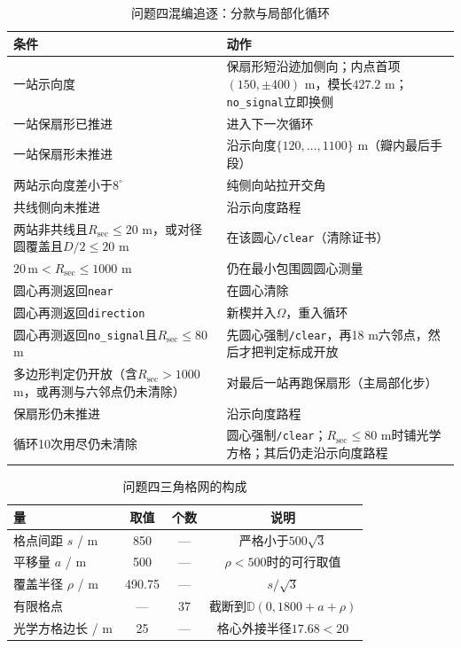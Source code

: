 \documentclass{cumcmthesis}
\begin{document}
\begin{table}[htbp]
\centering
\caption{问题四混编追逐：分款与局部化循环}
\label{tab:q4chase}
\begin{tabular}{>{\raggedright\arraybackslash}p{}>{\raggedright\arraybackslash}p{}}
\toprule
条件 & 动作 \\
\midrule
一站示向度 & 保扇形短沿迹加侧向；内点首项$(150,\pm 400)$ m，模长$427.2$ m；\texttt{no\_signal}立即换侧 \\
一站保扇形已推进 & 进入下一次循环 \\
一站保扇形未推进 & 沿示向度$\{120,\ldots,1100\}$ m（瓣内最后手段） \\
两站示向度差小于$8^\circ$ & 纯侧向站拉开交角 \\
共线侧向未推进 & 沿示向度路程 \\
两站非共线且$R_{\mathrm{sec}}\le 20$ m，或对径圆覆盖且$D/2\le 20$ m & 在该圆心\texttt{/clear}（清除证书） \\
$20\,\mathrm{m}<R_{\mathrm{sec}}\le 1000$ m & 仍在最小包围圆圆心测量 \\
圆心再测返回\texttt{near} & 在圆心清除 \\
圆心再测返回\texttt{direction} & 新楔并入$\Omega$，重入循环 \\
圆心再测返回\texttt{no\_signal}且$R_{\mathrm{sec}}\le 80$ m & 先圆心强制\texttt{/clear}，再18 m六邻点，然后才把判定标成开放 \\
多边形判定仍开放（含$R_{\mathrm{sec}}>1000$ m，或再测与六邻点仍未清除） & 对最后一站再跑保扇形（主局部化步） \\
保扇形仍未推进 & 沿示向度路程 \\
循环10次用尽仍未清除 & 圆心强制\texttt{/clear}；$R_{\mathrm{sec}}\le 80$ m时铺光学方格；其后仍走沿示向度路程 \\
\bottomrule
\end{tabular}
\end{table}

\begin{table}[htbp]
\centering
\caption{问题四三角格网的构成}
\label{tab:q4pts}
\begin{tabular}{lccc}
\toprule
量 & 取值 & 个数 & 说明 \\
\midrule
格点间距 $s$ / m & 850 & --- & 严格小于$500\sqrt{3}$ \\
平移量 $a$ / m & 500 & --- & $\rho<500$时的可行取值 \\
覆盖半径 $\rho$ / m & 490.75 & --- & $s/\sqrt{3}$ \\
有限格点 & --- & 37 & 截断到$\mathbb{D}(0,1800+a+\rho)$ \\
光学方格边长 / m & 25 & --- & 格心外接半径$17.68<20$ \\
\bottomrule
\end{tabular}
\end{table}
\end{document}
